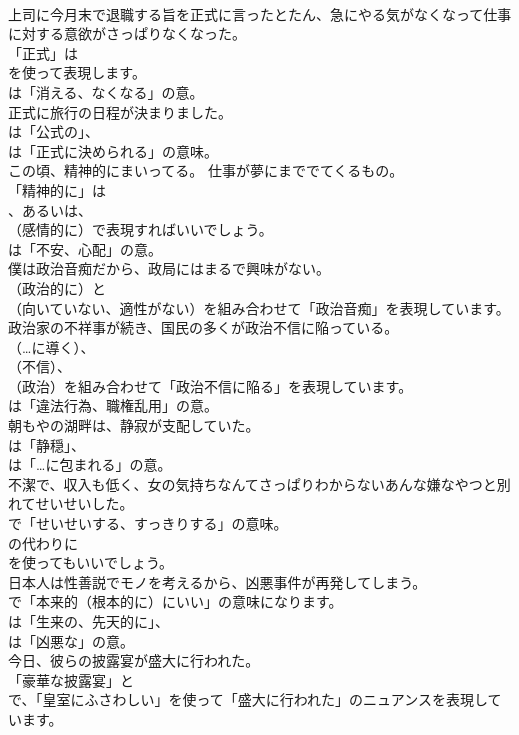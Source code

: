 \documentclass[8pt]{extreport}
\begin{document}
\begin{CJK}{UTF8}{min}
\\	上司に今月末で退職する旨を正式に言ったとたん、急にやる気がなくなって仕事に対する意欲がさっぱりなくなった。 
\\	「正式」は 
\\	を使って表現します。
\\	は「消える、なくなる」の意。	
\\	正式に旅行の日程が決まりました。 
\\	は「公式の」、
\\	は「正式に決められる」の意味。	
\\	この頃、精神的にまいってる。 仕事が夢にまででてくるもの。 
\\	「精神的に」は
\\	、あるいは、
\\	（感情的に）で表現すればいいでしょう。
\\	は「不安、心配」の意。	
\\	僕は政治音痴だから、政局にはまるで興味がない。 
\\	（政治的に）と
\\	（向いていない、適性がない）を組み合わせて「政治音痴」を表現しています。	
\\	政治家の不祥事が続き、国民の多くが政治不信に陥っている。 
\\	（…に導く）、
\\	（不信）、
\\	（政治）を組み合わせて「政治不信に陥る」を表現しています。
\\	は「違法行為、職権乱用」の意。	
\\	朝もやの湖畔は、静寂が支配していた。 
\\	は「静穏」、
\\	は「…に包まれる」の意。	
\\	不潔で、収入も低く、女の気持ちなんてさっぱりわからないあんな嫌なやつと別れてせいせいした。 
\\	で「せいせいする、すっきりする」の意味。
\\	の代わりに 
\\	を使ってもいいでしょう。	
\\	日本人は性善説でモノを考えるから、凶悪事件が再発してしまう。 
\\	で「本来的（根本的に）にいい」の意味になります。
\\	は「生来の、先天的に」、
\\	は「凶悪な」の意。	
\\	今日、彼らの披露宴が盛大に行われた。 
\\	「豪華な披露宴」と
\\	で、「皇室にふさわしい」を使って「盛大に行われた」のニュアンスを表現しています。

\end{CJK}
\end{document}
